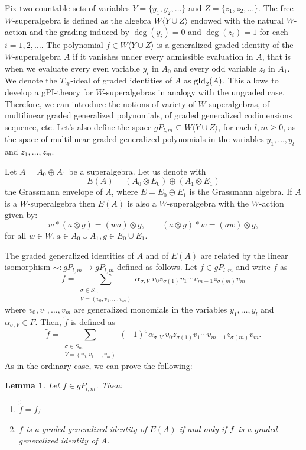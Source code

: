 \documentclass{article}
\newtheorem{lemma}[theorem]{Lemma}
\newcommand{\WYZ}{W\langle Y\cup Z\rangle}
\DeclareMathOperator{\gid}{\textnormal{gId}}
\begin{document}
Fix two countable sets of variables $Y=\{y_1,y_2,\dots\}$ and $Z=\{z_1,z_2,\dots\}$. The free $W$-superalgebra is defined as the algebra $\WYZ$ endowed with the natural $W$-action and the grading induced by $\deg(y_i)=0$ and $\deg(z_i)=1$ for each $i=1,2,\dots$. The polynomial $f\in\WYZ$ is a generalized graded identity of the $W$-superalgebra $A$ if it vanishes under every admissible evaluation in $A$, that is when we evaluate every even variable $y_i$ in $A_0$ and every odd variable $z_i$ in $A_1$. We denote the $T_W$-ideal of graded identities of $A$ as $\gid_2(A)$. This allows to develop a gPI-theory for $W$-superalgebras in analogy with the ungraded case. Therefore, we can introduce the notions of variety of $W$-superalgebras, of multilinear graded generalized polynomials, of graded generalized codimensions sequence, etc. Let's also define the space $gP_{l,m}\subseteq \WYZ$, for each $l,m\geq 0$, as the space of multilinear graded generalized polynomials in the variables 
$y_1,\dots,y_l$ and $z_1,\dots,z_m$.
 
Let $A=A_0 \oplus A_1$ be a superalgebra. Let us denote with \[E(A)=(A_0 \otimes E_0) \oplus (A_1 \otimes E_1)\] the Grassmann envelope of $A$, where $E=E_0\oplus E_1$ is the Grassmann algebra. If $A$ is a $W$-superalgebra then $E(A)$ is also a $W$-superalgebra with the $W$-action given by:
\[
w*(a\otimes g)=(wa)\otimes g, \qquad (a\otimes g)*w=(aw)\otimes g,
\]
for all $w \in W, a \in A_0\cup A_1, g \in E_0\cup E_1$. 

The graded generalized identities of $A$ and of $E(A)$ are related by the linear isomorphism $\sim:gP_{l,m} \to gP_{l,m}$ defined as follows. Let $f \in gP_{l,m}$ and write $f$ as
\[
f=\sum_{\substack{\sigma \in S_m \\ V=(v_0,v_1,\ldots,v_m)}} \alpha_{\sigma,V}\ v_0z_{\sigma(1)}v_1\cdots v_{m-1}z_{\sigma(m)}v_m
\]
where $v_0,v_1,\ldots,v_m$ are generalized monomials in the variables $y_1,\ldots,y_l$ and $\alpha_{\sigma,V} \in F$. Then, $\tilde{f}$ is defined as
\[
\tilde{f}= \sum_{\substack{\sigma \in S_m \\ V=(v_0,v_1,\ldots,v_m)}} (-1)^\sigma \alpha_{\sigma,V}\ v_0z_{\sigma(1)}v_1\cdots v_{m-1}z_{\sigma(m)}v_m.
\]
As in the ordinary case, we can prove the following:
\begin{lemma}\label{3.7.4}
Let $f\in gP_{l,m}$. Then: 
  \begin{enumerate}
    \item [1)] $\tilde{\tilde{f}}=f$;
    \item [2)] $f$ is a graded generalized identity of $E(A)$ if and only if $\Tilde{f}$ is a graded generalized identity of $A$.
  \end{enumerate}
\end{lemma}
\end{document}
